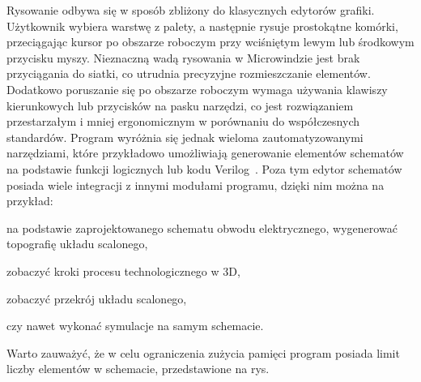 \indent Rysowanie odbywa się w sposób zbliżony do klasycznych edytorów grafiki.
Użytkownik wybiera warstwę z palety,
a następnie rysuje prostokątne komórki,
przeciągając kursor po obszarze roboczym przy wciśniętym lewym lub środkowym przycisku myszy. 
Nieznaczną wadą rysowania w Microwindzie jest brak przyciągania do siatki,
co utrudnia precyzyjne rozmieszczanie elementów.
Dodatkowo poruszanie się po obszarze roboczym wymaga używania klawiszy kierunkowych lub przycisków na pasku narzędzi,
co jest rozwiązaniem przestarzałym i mniej ergonomicznym w porównaniu do współczesnych standardów.
Program wyróżnia się jednak wieloma zautomatyzowanymi narzędziami,
które przykładowo umożliwiają generowanie elementów schematów na podstawie funkcji logicznych lub kodu Verilog~\cite{microwind_operation_commands}. 
Poza tym edytor schematów posiada wiele integracji z innymi modułami programu,
dzięki nim można na przykład:
\begin{citemize}
    \item na podstawie zaprojektowanego schematu obwodu elektrycznego, wygenerować topografię układu scalonego,
    \item zobaczyć kroki procesu technologicznego w 3D,
    \item zobaczyć przekrój układu scalonego,
    \item czy nawet wykonać symulacje na samym schemacie.
\end{citemize}
Warto zauważyć, że w celu ograniczenia zużycia pamięci program posiada limit liczby elementów w schemacie,
przedstawione na rys.

